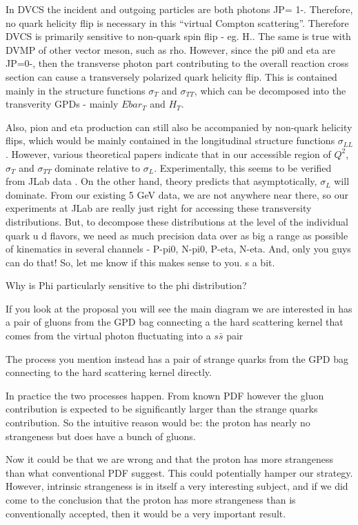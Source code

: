         In DVCS the  incident and  outgoing particles are both photons JP= 1-. Therefore, no quark helicity flip is necessary in this “virtual Compton scattering”.  Therefore DVCS is primarily sensitive to non-quark spin flip - eg. H.. The same is true with DVMP of other vector meson, such as rho.  
    	However,  since the pi0 and eta are JP=0-, then the transverse photon part contributing to the overall reaction cross section can cause a transversely polarized  quark helicity flip. This is contained mainly  in the structure functions $\sigma_T$ and $\sigma_{TT}$, which can be decomposed into the transverity GPDs - mainly $Ebar_T$ and $H_T$. 
    	
    	Also, pion and eta production can still also be accompanied by non-quark helicity flips, which would be mainly contained in the longitudinal structure functions $\sigma_{LL}$. However, various theoretical papers indicate that in our accessible region of $Q^2$, $\sigma_T$ and $\sigma_{TT}$ dominate relative to $\sigma_L$. Experimentally, this seems to be verified from JLab data .
    	On the other hand, theory predicts that asymptotically, $\sigma_L$ will dominate. From our existing 5 GeV  data, we are not anywhere near there, so our experiments at JLab are really just right for accessing these transversity distributions.  But, to decompose these distributions  at the level of the individual quark u d flavors, we need as much precision data over as big a range as possible of kinematics in several channels - P-pi0, N-pi0, P-eta, N-eta. And, only you guys can do that!
    	So, let me know if this makes sense to you. s a bit. 
    	
        Why is Phi particularly sensitive to the phi distribution?

        If you look at the proposal you will see the main diagram we are interested in has a pair of gluons from the GPD bag connecting a the hard scattering kernel that comes from the virtual photon fluctuating into a $s\bar{s}$ pair
        
        The process you mention instead has a pair of strange quarks from the GPD bag connecting to the hard scattering kernel directly. 
        
        In practice the two processes happen. From known PDF however the gluon contribution is expected to be significantly larger than the strange quarks contribution. So the intuitive reason would be: the proton has nearly no strangeness but does have a bunch of gluons.
        
        Now it could be that we are wrong and that the proton has more strangeness than what conventional PDF suggest. This could potentially hamper our strategy. However, intrinsic strangeness is in itself a very interesting subject, and if we did come to the conclusion that the proton has more strangeness than is conventionally accepted, then it would be a very important result.
        
